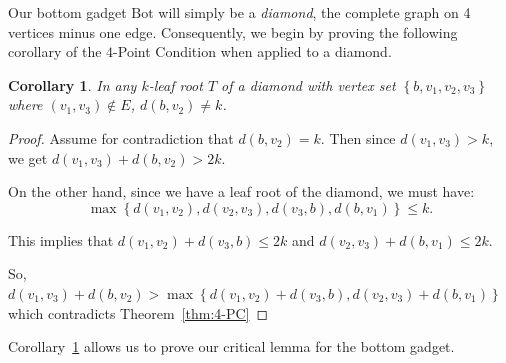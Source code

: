 \documentclass[11pt,letter]{article}
\newtheorem{corollary}[theorem]{Corollary}
\theoremstyle{remark}
\newcommand{\B}{\text{Bot}}
\newcommand{\set}[1]{\left\{#1\right\}}
\begin{document}
Our bottom gadget $\B$ will simply be a {\em diamond}, the complete graph on 4 vertices minus one edge.
Consequently, we begin by proving the following corollary of the $4$-Point Condition when applied to a diamond.

\begin{corollary}\label{cor:diamond}
    In any $k$-leaf root $T$ of a diamond with vertex set $\set{b,v_1,v_2,v_3}$ where $(v_1,v_3)\notin E$, $d(b,v_2)\neq k$.
\end{corollary}

\begin{proof}
    Assume for contradiction that $d(b, v_2) = k$.
    Then since $d(v_1,v_3)>k$, we get $d(v_1,v_3)+d(b,v_2)>2k$. 
    
    On the other hand, since we have a leaf root of the diamond, we must have:
    \[\max\set{d(v_1,v_2),d(v_2,v_3),d(v_3,b),d(b,v_1)}\leq k.\]
    
    This implies that $d(v_1,v_2)+d(v_3,b)\leq 2k$ and $d(v_2,v_3)+d(b,v_1)\leq 2k$. 

    So, $d(v_1,v_3)+d(b,v_2)>\max\set{d(v_1,v_2)+d(v_3,b),d(v_2,v_3)+d(b,v_1)}$ which contradicts Theorem~\ref{thm:4-PC}
\end{proof}

Corollary~\ref{cor:diamond} allows us to prove our critical lemma for the bottom gadget.

\bot*
\end{document}
